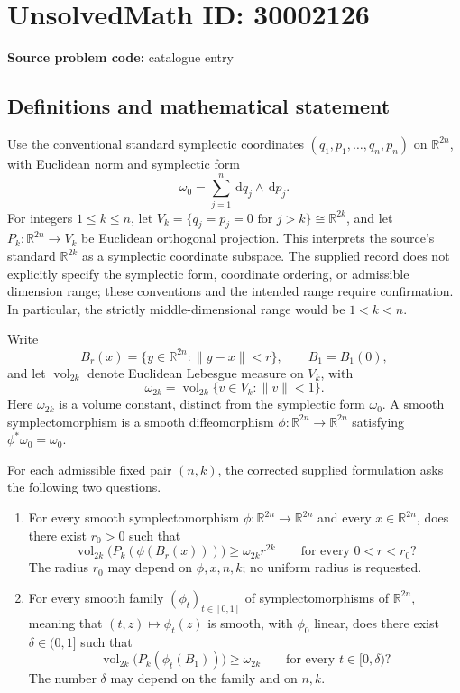 \documentclass[11pt]{article}
\newcommand{\R}{\mathbb{R}}
\newcommand{\dd}{\,\mathrm{d}}
\begin{document}
\section*{UnsolvedMath ID: 30002126}
\textbf{Source problem code:} catalogue entry
\subsection{Definitions and mathematical statement}
Use the conventional standard symplectic coordinates \((q_1,p_1,\ldots,q_n,p_n)\) on \(\R^{2n}\), with Euclidean norm and symplectic form
\[
\omega_0=\sum_{j=1}^{n}\dd q_j\wedge\dd p_j.
\]
For integers \(1\leq k\leq n\), let \(V_k=\{q_j=p_j=0\text{ for }j>k\}\cong\R^{2k}\), and let \(P_k:\R^{2n}\to V_k\) be Euclidean orthogonal projection. This interprets the source's standard \(\R^{2k}\) as a symplectic coordinate subspace. The supplied record does not explicitly specify the symplectic form, coordinate ordering, or admissible dimension range; these conventions and the intended range require confirmation. In particular, the strictly middle-dimensional range would be \(1<k<n\).

Write
\[
B_r(x)=\{y\in\R^{2n}:\|y-x\|<r\},\qquad B_1=B_1(0),
\]
and let \(\operatorname{vol}_{2k}\) denote Euclidean Lebesgue measure on \(V_k\), with
\[
\omega_{2k}=\operatorname{vol}_{2k}\{v\in V_k:\|v\|<1\}.
\]
Here \(\omega_{2k}\) is a volume constant, distinct from the symplectic form \(\omega_0\). A smooth symplectomorphism is a smooth diffeomorphism \(\phi:\R^{2n}\to\R^{2n}\) satisfying \(\phi^*\omega_0=\omega_0\).

For each admissible fixed pair \((n,k)\), the corrected supplied formulation asks the following two questions.
\begin{enumerate}
\item For every smooth symplectomorphism \(\phi:\R^{2n}\to\R^{2n}\) and every \(x\in\R^{2n}\), does there exist \(r_0>0\) such that
\[
\operatorname{vol}_{2k}\bigl(P_k(\phi(B_r(x)))\bigr)\geq\omega_{2k}r^{2k}
\qquad\text{for every }0<r<r_0?
\]
The radius \(r_0\) may depend on \(\phi,x,n,k\); no uniform radius is requested.
\item For every smooth family \((\phi_t)_{t\in[0,1]}\) of symplectomorphisms of \(\R^{2n}\), meaning that \((t,z)\mapsto\phi_t(z)\) is smooth, with \(\phi_0\) linear, does there exist \(\delta\in(0,1]\) such that
\[
\operatorname{vol}_{2k}\bigl(P_k(\phi_t(B_1))\bigr)\geq\omega_{2k}
\qquad\text{for every }t\in[0,\delta)?
\]
The number \(\delta\) may depend on the family and on \(n,k\).
\end{enumerate}
\end{document}

